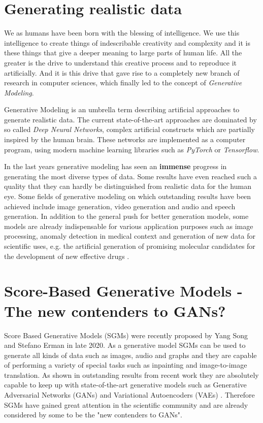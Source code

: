 
\section{Generating realistic data} %
\thispagestyle{plain}
We as humans have been born with the blessing of intelligence. We use this intelligence to create things of indescribable creativity and complexity and it is these things that give a deeper meaning to large parts of human life. All the greater is the drive to understand this creative process and to reproduce it artificially. And it is this drive that gave rise to a completely new branch of research in computer sciences, which finally led to the concept of \textit{Generative Modeling}.

\thispagestyle{plain}
Generative Modeling is an umbrella term describing artificial approaches to generate realistic data. The current state-of-the-art approaches are dominated by so called \textit{Deep Neural Networks}, complex artificial constructs which are partially inspired by the human brain. These networks are implemented as a computer program, using modern machine learning libraries such as \textit{PyTorch} or \textit{Tensorflow}.

\thispagestyle{plain}
In the last years generative modeling has seen an \textbf{immense} progress in generating the most diverse types of data. Some results have even reached such a quality that they can hardly be distinguished from realistic data for the human eye. Some fields of generative modeling on which outstanding results have been achieved include image generation, video generation and audio and speech generation. In addition to the general push for better generation models, some models are already indispensable for various application purposes such as image processing, anomaly detection in medical context and generation of new data for scientific uses, e.g. the artificial generation of promising molecular candidates for the development of new effective drugs \cite{molgrad}.
\thispagestyle{plain}
\section{Score-Based Generative Models - The new contenders to GANs?} 
\thispagestyle{plain}
Score Based Generative Models (SGMs) were recently proposed by Yang Song and Stefano Erman \cite{score_1} in late 2020. As a generative model SGMs can be used to generate all kinds of data such as images, audio and graphs and they are capable of performing a variety of special tasks such as inpainting and image-to-image translation. As shown in outstanding results from recent work \cite{score_3} they are absolutely capable to keep up with state-of-the-art generative models such as Generative Adversarial Networks (GANs) \cite{gan_original} and Variational Autoencoders (VAEs) \cite{vae_original}. Therefore SGMs have gained great attention in the scientific community and are already considered by some to be the "new contenders to GANs".


